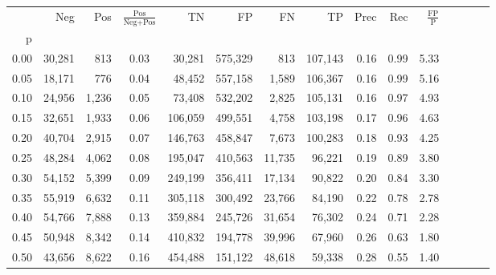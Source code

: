 \begin{tabular}{rrrcrrrrrrrrrrr}
\toprule
{} &     Neg &    Pos & $\frac{\text{Pos}}{\text{Neg}+\text{Pos}}$ &       TN &       FP &       FN &       TP &  Prec &   Rec & $\frac{\text{FP}}{\text{P}}$ \\
p    &         &        &                                            &          &          &          &          &       &       &                              \\
\midrule
0.00 &  30,281 &    813 &                                       0.03 &   30,281 &  575,329 &      813 &  107,143 &  0.16 &  0.99 &                         5.33 \\
0.05 &  18,171 &    776 &                                       0.04 &   48,452 &  557,158 &    1,589 &  106,367 &  0.16 &  0.99 &                         5.16 \\
0.10 &  24,956 &  1,236 &                                       0.05 &   73,408 &  532,202 &    2,825 &  105,131 &  0.16 &  0.97 &                         4.93 \\
0.15 &  32,651 &  1,933 &                                       0.06 &  106,059 &  499,551 &    4,758 &  103,198 &  0.17 &  0.96 &                         4.63 \\
0.20 &  40,704 &  2,915 &                                       0.07 &  146,763 &  458,847 &    7,673 &  100,283 &  0.18 &  0.93 &                         4.25 \\
0.25 &  48,284 &  4,062 &                                       0.08 &  195,047 &  410,563 &   11,735 &   96,221 &  0.19 &  0.89 &                         3.80 \\
0.30 &  54,152 &  5,399 &                                       0.09 &  249,199 &  356,411 &   17,134 &   90,822 &  0.20 &  0.84 &                         3.30 \\
0.35 &  55,919 &  6,632 &                                       0.11 &  305,118 &  300,492 &   23,766 &   84,190 &  0.22 &  0.78 &                         2.78 \\
0.40 &  54,766 &  7,888 &                                       0.13 &  359,884 &  245,726 &   31,654 &   76,302 &  0.24 &  0.71 &                         2.28 \\
0.45 &  50,948 &  8,342 &                                       0.14 &  410,832 &  194,778 &   39,996 &   67,960 &  0.26 &  0.63 &                         1.80 \\
0.50 &  43,656 &  8,622 &                                       0.16 &  454,488 &  151,122 &   48,618 &   59,338 &  0.28 &  0.55 &                         1.40 \\

\end{tabular}
